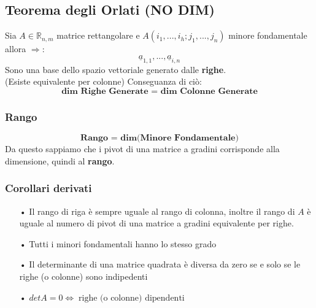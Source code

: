 \subsection{Teorema degli Orlati (NO DIM)}
Sia $A \in \mathbb{R}_{n,m} $ matrice rettangolare e $A(i_1,...,i_h; j_1,...,j_n)$ minore fondamentale allora $\Rightarrow$:
$$ \underline{a}_{1,1},...,\underline{a}_{i,n}$$
Sono una base dello spazio vettoriale generato dalle \textbf{righe}.\\
(Esiste equivalente per colonne)
Conseguanza di ciò:
$$ \textbf{dim Righe Generate = dim Colonne Generate} $$

\subsubsection{Rango}
$$ \textbf{Rango = dim(Minore Fondamentale)} $$
Da questo sappiamo che i pivot di una matrice a gradini corrisponde alla dimensione, quindi al \textbf{rango}.

\subsubsection{Corollari derivati}
\begin{itemize}
\item[•] Il rango di riga è sempre uguale al rango di colonna, inoltre il rango di $A$ è uguale al numero di pivot di una matrice a gradini equivalente per righe.
\item[•] Tutti i minori fondamentali hanno lo stesso grado
\item[•] Il determinante di una matrice quadrata è diversa da zero se e solo se le righe (o colonne) sono indipedenti
\item[•] $det A = 0 \Leftrightarrow \; \text{righe (o colonne) dipendenti}$
\end{itemize}

